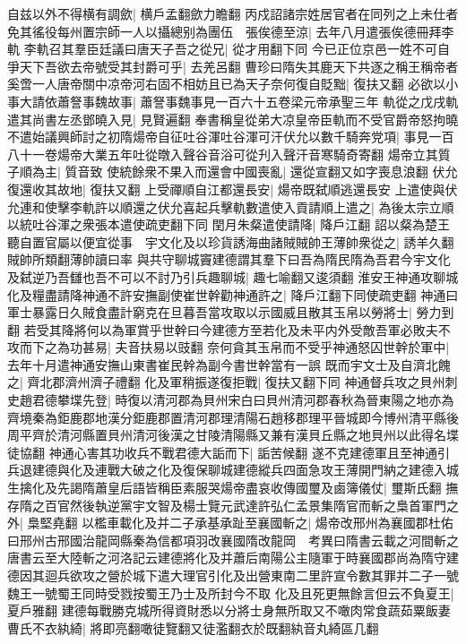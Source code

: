 自兹以外不得横有調歛|{
	横戶孟翻歛力瞻翻}
丙戍詔諸宗姓居官者在同列之上未仕者免其徭役每州置宗師一人以攝總别為團伍　張俟德至涼|{
	去年八月遣張俟德冊拜李軌}
李軌召其羣臣廷議曰唐天子吾之從兄|{
	從才用翻下同}
今已正位京邑一姓不可自爭天下吾欲去帝號受其封爵可乎|{
	去羌呂翻}
曹珍曰隋失其鹿天下共逐之稱王稱帝者奚啻一人唐帝關中凉帝河右固不相妨且已為天子奈何復自貶黜|{
	復扶又翻}
必欲以小事大請依蕭詧事魏故事|{
	蕭詧事魏事見一百六十五卷梁元帝承聖三年}
軌從之戊戌軌遣其尚書左丞鄧曉入見|{
	見賢遍翻}
奉書稱皇從弟大凉皇帝臣軌而不受官爵帝怒拘曉不遣始議興師討之初隋煬帝自征吐谷渾吐谷渾可汗伏允以數千騎奔党項|{
	事見一百八十一卷煬帝大業五年吐從暾入聲谷音浴可從刋入聲汗音寒騎奇寄翻}
煬帝立其質子順為主|{
	質音致}
使統餘衆不果入而還會中國喪亂|{
	還從宣翻又如字喪息浪翻}
伏允復還收其故地|{
	復扶又翻}
上受禪順自江都還長安|{
	煬帝既弑順逃還長安}
上遣使與伏允連和使擊李軌許以順還之伏允喜起兵擊軌數遣使入貢請順上遣之|{
	為後太宗立順以統吐谷渾之衆張本遣使疏吏翻下同}
閏月朱粲遣使請降|{
	降戶江翻}
詔以粲為楚王聽自置官屬以便宜從事　宇文化及以珍貨誘海曲諸賊賊帥王薄帥衆從之|{
	誘羊久翻賊帥所類翻薄帥讀曰率}
與共守聊城竇建德謂其羣下曰吾為隋民隋為吾君今宇文化及弑逆乃吾讎也吾不可以不討乃引兵趣聊城|{
	趣七喻翻又逡須翻}
淮安王神通攻聊城化及糧盡請降神通不許安撫副使崔世幹勸神通許之|{
	降戶江翻下同使疏吏翻}
神通曰軍士暴露日久賊食盡計窮克在旦暮吾當攻取以示國威且散其玉帛以勞將士|{
	勞力到翻}
若受其降將何以為軍賞乎世幹曰今建德方至若化及未平内外受敵吾軍必敗夫不攻而下之為功甚易|{
	夫音扶易以豉翻}
奈何貪其玉帛而不受乎神通怒囚世幹於軍中|{
	去年十月遣神通安撫山東書崔民幹為副今書世幹當有一誤}
既而宇文士及自濟北餽之|{
	齊北郡濟州濟子禮翻}
化及軍稍振遂復拒戰|{
	復扶又翻下同}
神通督兵攻之貝州刺史趙君德攀堞先登|{
	時復以清河郡為貝州宋白曰貝州清河郡春秋為晉東陽之地亦為齊境秦為鉅鹿郡地漢分鉅鹿郡置清河郡理清陽石趙移郡理平晉城即今博州清平縣後周平齊於清河縣置貝州清河後漢之甘陵清陽縣又兼有漢貝丘縣之地貝州以此得名堞徒協翻}
神通心害其功收兵不戰君德大詬而下|{
	詬苦候翻}
遂不克建德軍且至神通引兵退建德與化及連戰大破之化及復保聊城建德縱兵四面急攻王薄開門納之建德入城生擒化及先謁隋蕭皇后語皆稱臣素服哭煬帝盡哀收傳國璽及鹵簿儀仗|{
	璽斯氏翻}
撫存隋之百官然後執逆黨宇文智及楊士覽元武達許弘仁孟景集隋官而斬之梟首軍門之外|{
	梟堅堯翻}
以檻車載化及并二子承基承趾至襄國斬之|{
	煬帝改邢州為襄國郡杜佑曰邢州古邢國治龍岡縣秦為信都項羽改襄國隋改龍岡　考異曰隋書云載之河間斬之唐書云至大陸斬之河洛記云建德將化及并蕭后南陽公主隨軍于時襄國郡尚為隋守建德因其迴兵欲攻之營於城下遣大理官引化及出營東南二里許宣令數其罪并二子一號魏王一號蜀王同時受戮按蜀王乃士及所封今不取}
化及且死更無餘言但云不負夏王|{
	夏戶雅翻}
建德每戰勝克城所得資財悉以分將士身無所取又不噉肉常食蔬茹粟飯妻曹氏不衣紈綺|{
	將即亮翻噉徒覽翻又徒濫翻衣於既翻紈音丸綺區几翻}
